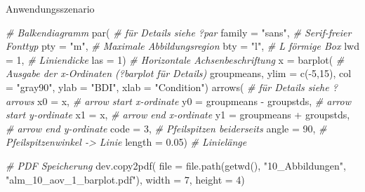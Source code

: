 \documentclass[
  8pt,
  ignorenonframetext,
]{beamer}
\newenvironment{Shaded}{\begin{snugshade}}{\end{snugshade}}
\newcommand{\AttributeTok}[1]{\textcolor[rgb]{0.77,0.63,0.00}{#1}}
\newcommand{\CommentTok}[1]{\textcolor[rgb]{0.56,0.35,0.01}{\textit{#1}}}
\newcommand{\DecValTok}[1]{\textcolor[rgb]{0.00,0.00,0.81}{#1}}
\newcommand{\FloatTok}[1]{\textcolor[rgb]{0.00,0.00,0.81}{#1}}
\newcommand{\FunctionTok}[1]{\textcolor[rgb]{0.00,0.00,0.00}{#1}}
\newcommand{\NormalTok}[1]{#1}
\newcommand{\OtherTok}[1]{\textcolor[rgb]{0.56,0.35,0.01}{#1}}
\newcommand{\SpecialCharTok}[1]{\textcolor[rgb]{0.00,0.00,0.00}{#1}}
\newcommand{\StringTok}[1]{\textcolor[rgb]{0.31,0.60,0.02}{#1}}
\begin{document}
\begin{frame}[fragile]{Anwendungsszenario}
\begin{Shaded}
\begin{Highlighting}[]
\CommentTok{\# Balkendiagramm}
\FunctionTok{par}\NormalTok{(                                               }\CommentTok{\# für Details siehe ?par}
\AttributeTok{family      =} \StringTok{"sans"}\NormalTok{,                              }\CommentTok{\# Serif{-}freier Fonttyp}
\AttributeTok{pty         =} \StringTok{"m"}\NormalTok{,                                 }\CommentTok{\# Maximale Abbildungsregion}
\AttributeTok{bty         =} \StringTok{"l"}\NormalTok{,                                 }\CommentTok{\# L förmige Box}
\AttributeTok{lwd         =} \DecValTok{1}\NormalTok{,                                   }\CommentTok{\# Liniendicke}
\AttributeTok{las         =} \DecValTok{1}\NormalTok{)                                   }\CommentTok{\# Horizontale Achsenbeschriftung}
\NormalTok{x }\OtherTok{=} \FunctionTok{barplot}\NormalTok{(                                       }\CommentTok{\# Ausgabe der x{-}Ordinaten (?barplot für Details)}
\NormalTok{groupmeans,}
\AttributeTok{ylim        =} \FunctionTok{c}\NormalTok{(}\SpecialCharTok{{-}}\DecValTok{5}\NormalTok{,}\DecValTok{15}\NormalTok{),}
\AttributeTok{col         =} \StringTok{"gray90"}\NormalTok{,}
\AttributeTok{ylab        =} \StringTok{"BDI"}\NormalTok{,}
\AttributeTok{xlab        =} \StringTok{"Condition"}\NormalTok{)}
\FunctionTok{arrows}\NormalTok{(                                            }\CommentTok{\# für Details siehe ?arrows}
\AttributeTok{x0          =}\NormalTok{ x,                                   }\CommentTok{\# arrow start x{-}ordinate}
\AttributeTok{y0          =}\NormalTok{ groupmeans }\SpecialCharTok{{-}}\NormalTok{ groupstds,              }\CommentTok{\# arrow start y{-}ordinate}
\AttributeTok{x1          =}\NormalTok{ x,                                   }\CommentTok{\# arrow end   x{-}ordinate}
\AttributeTok{y1          =}\NormalTok{ groupmeans }\SpecialCharTok{+}\NormalTok{ groupstds,              }\CommentTok{\# arrow end   y{-}ordinate}
\AttributeTok{code        =} \DecValTok{3}\NormalTok{,                                   }\CommentTok{\# Pfeilspitzen beiderseits}
\AttributeTok{angle       =} \DecValTok{90}\NormalTok{,                                  }\CommentTok{\# Pfeilspitzenwinkel {-}\textgreater{} Linie}
\AttributeTok{length      =} \FloatTok{0.05}\NormalTok{)                                }\CommentTok{\# Linielänge}

\CommentTok{\# PDF Speicherung}
\FunctionTok{dev.copy2pdf}\NormalTok{(}
\AttributeTok{file        =} \FunctionTok{file.path}\NormalTok{(}\FunctionTok{getwd}\NormalTok{(), }\StringTok{"10\_Abbildungen"}\NormalTok{, }\StringTok{"alm\_10\_aov\_1\_barplot.pdf"}\NormalTok{),}
\AttributeTok{width       =} \DecValTok{7}\NormalTok{,}
\AttributeTok{height      =} \DecValTok{4}\NormalTok{)}
\end{Highlighting}
\end{Shaded}
\end{frame}
\end{document}
